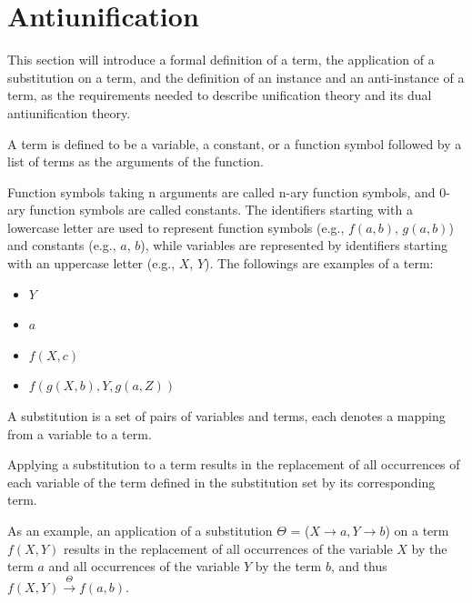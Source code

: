 \section{Antiunification}   \label{AU}

This section will introduce a formal definition of a term, the application of a substitution on a term, and the definition of an instance and an anti-instance of a term, as the requirements needed  to describe unification theory and its dual antiunification theory.

\begin{defn}[Term]\label{def:term}
A term is defined to be a variable, a constant, or a function symbol followed by a list of terms as the arguments of the function.
\end{defn}

Function symbols taking n arguments are called n-ary function symbols, and 0-ary function symbols are called constants. The identifiers starting with a lowercase letter are used to represent function symbols (e.g., $f(a,b)$, $g(a,b)$) and constants (e.g., $a$, $b$), while variables are represented by identifiers starting with an uppercase letter (e.g., $X$, $Y$). The followings are examples of a term:
\begin{itemize} [leftmargin=0.7in]
\item $Y$
\item $a$
\item $f(X, c)$
\item $f(g(X, b),Y, g(a, Z))$
\end{itemize}
\begin{defn}[Substitution]\label{def:substitution}
A substitution is a set of pairs of variables and terms, each denotes a mapping from a variable to a term.
\end{defn}

\begin{defn}\label{def:substitution}
Applying a substitution to a term results in the replacement of all occurrences of each variable of the term defined in the substitution set by its corresponding term.
\end{defn}

As an example, an application of a substitution $\Theta$ = ({$X \rightarrow a, Y \rightarrow b $})
on a term $f(X,Y)$ results in the replacement of all occurrences of the variable $X$ by the term $a$ and all occurrences of the variable $Y$ by the term $b$, and thus $f(X,Y)\xrightarrow{\Theta} f(a,b)$.



